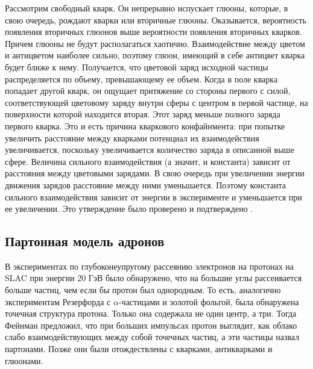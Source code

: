 \documentclass[12pt, a4paper]{article}
\begin{document}
Рассмотрим свободный кварк. Он непрерывно испускает глюоны, которые, в свою очередь, рождают кварки или вторичные глюоны. Оказывается, вероятность появления вторичных глюонов выше вероятности появления вторичных кварков. 
Причем глюоны не будут располагаться хаотично. Взаимодействие между цветом и антицветом наиболее сильно, поэтому глюон, имеющий в себе антицвет кварка будет ближе к нему. Получается, что цветовой заряд исходной частицы распределяется по объему, превышающему ее объем. Когда в поле кварка попадает другой кварк, он ощущает притяжение со стороны первого с силой, соответствующей цветовому заряду внутри сферы с центром в первой частице, на поверхности которой находится вторая. Этот заряд меньше полного заряда первого кварка. Это и есть причина кваркового конфайнмента: при попытке увеличить расстояние между кварками потенциал их взаимодействия увеличивается, поскольку увеличивается количество заряда в описанной выше сфере. Величина сильного взаимодействия (а значит, и константа) зависит от расстояния между цветовыми зарядами. В свою очередь при увеличении энергии движения зарядов расстояние между ними уменьшается. Поэтому константа сильного взаимодействия зависит от энергии в эксперименте и уменьшается при ее увеличении. Это утверждение было проверено и подтверждено \cite{strong_coupling}.

\subsection{Партонная модель адронов}
В экспериментах по глубоконеупругому рассеянию электронов на протонах на SLAC \cite{SLAC} при энергии 20 ГэВ было обнаружено, что на большие углы рассеивается больше частиц, чем если бы протон был однородным. То есть, аналогично экспериментам Резерфорда с $\alpha$-частицами и золотой фольгой, была обнаружена точечная структура протона. Только она содержала не один центр, а три. Тогда Фейнман предложил, что при больших импульсах протон выглядит, как облако слабо взаимодействующих между собой точечных частиц, а эти частицы назвал партонами. Позже они были отождествлены с кварками, антикварками и глюонами.

\end{document}
